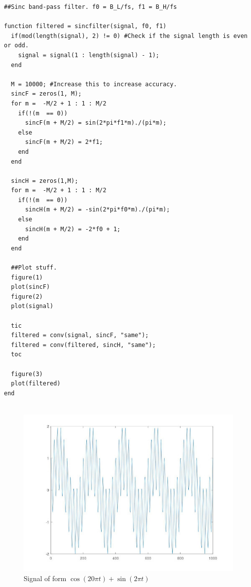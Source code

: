 \documentclass{article}
\begin{document}
\begin{verbatim}
##Sinc band-pass filter. f0 = B_L/fs, f1 = B_H/fs

function filtered = sincfilter(signal, f0, f1)
  if(mod(length(signal), 2) != 0) #Check if the signal length is even or odd.
    signal = signal(1 : length(signal) - 1);
  end
  
  M = 10000; #Increase this to increase accuracy.
  sincF = zeros(1, M);
  for m =  -M/2 + 1 : 1 : M/2 
    if(!(m  == 0))
      sincF(m + M/2) = sin(2*pi*f1*m)./(pi*m);
    else
      sincF(m + M/2) = 2*f1;
    end
  end

  sincH = zeros(1,M);
  for m =  -M/2 + 1 : 1 : M/2 
    if(!(m  == 0))
      sincH(m + M/2) = -sin(2*pi*f0*m)./(pi*m);
    else
      sincH(m + M/2) = -2*f0 + 1;
    end
  end
  
  ##Plot stuff.
  figure(1)
  plot(sincF)
  figure(2)
  plot(signal)

  tic
  filtered = conv(signal, sincF, "same");
  filtered = conv(filtered, sincH, "same");
  toc

  figure(3)
  plot(filtered)
end


\end{verbatim}



\begin{figure}
  \includegraphics[width=\linewidth]{signal.jpg}
  \caption{Signal of form $\cos(20 \pi t) + \sin(2 \pi t)$}
\end{figure}
\end{document}
